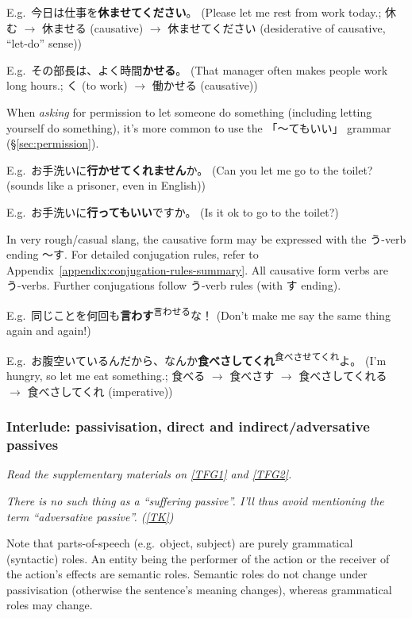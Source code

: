 \documentclass[../nihongo-gakushuu-kyouzai.tex]{subfiles}
\begin{document}
E.g.\ 今日は仕事を\textbf{休ませてください}。 (Please let me rest from work today.; 休む $\to$ 休ませる (causative) $\to$ 休ませてください (desiderative of causative, ``let-do'' sense))

E.g.\ その部長は、よく時間\textbf{かせる}。 (That manager often makes people work long hours.; く (to work) $\to$ 働かせる (causative))

When \emph{asking} for permission to let someone do something (including letting yourself do something), it's more common to use the 「〜てもいい」 grammar (\S\ref{sec:permission}).

E.g.\ お手洗いに\textbf{行かせてくれません}か。 (Can you let me go to the toilet? (sounds like a prisoner, even in English))

E.g.\ お手洗いに\textbf{行ってもいい}ですか。 (Is it ok to go to the toilet?)

In very rough/casual slang, the causative form may be expressed with the う-verb ending 〜す. For detailed conjugation rules, refer to Appendix~\ref{appendix:conjugation-rules-summary}. All causative form verbs are う-verbs. Further conjugations follow う-verb rules (with す ending).

E.g.\ 同じことを何回も\textbf{言わす}\textsuperscript{言わせる}な！ (Don't make me say the same thing again and again!)

E.g.\ お腹空いているんだから、なんか\textbf{食べさしてくれ}\textsuperscript{食べさせてくれ}よ。 (I'm hungry, so let me eat something.; 食べる $\to$ 食べさす $\to$ 食べさしてくれる $\to$ 食べさしてくれ (imperative))

\subsubsection{Interlude: passivisation, direct and indirect/adversative passives} \label{sec:direct-and-indirect-adversative-passive}
\emph{Read the supplementary materials on \href{https://www.tofugu.com/japanese-grammar/verb-passive-form-rareru\#direct-vs-indirect-passive}{[TFG1]} and \href{https://www.tofugu.com/japanese-grammar/particle-ni/\#in-passive-sentences}{[TFG2]}.}

\emph{There is no such thing as a ``suffering passive''. I'll thus avoid mentioning the term ``adversative passive''. (\href{https://www.guidetojapanese.org/blog/2005/09/09/no-suffering-passive/}{[TK]})}

Note that parts-of-speech (e.g.\ object, subject) are purely grammatical (syntactic) roles. An entity being the performer of the action or the receiver of the action's effects are semantic roles. Semantic roles do not change under passivisation (otherwise the sentence's meaning changes), whereas grammatical roles may change.
\end{document}
